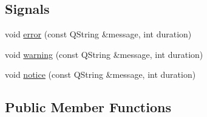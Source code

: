\subsection*{Signals}
\begin{DoxyCompactItemize}
\item 
void \hyperlink{classdviRenderer_ac3e658a3f6b99c724413fc1f5663f976}{error} (const Q\+String \&message, int duration)
\item 
void \hyperlink{classdviRenderer_a07b2460ad76478aa074720e2fd4876bd}{warning} (const Q\+String \&message, int duration)
\item 
void \hyperlink{classdviRenderer_a28699d83c94c30eb2ab1d8b6de07b46a}{notice} (const Q\+String \&message, int duration)
\end{DoxyCompactItemize}
\subsection*{Public Member Functions}
